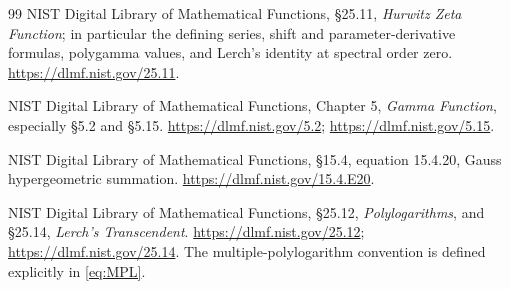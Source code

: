 \documentclass[11pt,letterpaper]{article}
\numberwithin{equation}{section}
\theoremstyle{definition}\newtheorem{definition}[theorem]{Definition}
\theoremstyle{remark}\newtheorem{remark}[theorem]{Remark}
\begin{document}
\begin{thebibliography}{99}
NIST Digital Library of Mathematical Functions,
\S25.11, \emph{Hurwitz Zeta Function}; in particular the defining series,
shift and parameter-derivative formulas, polygamma values, and Lerch's
identity at spectral order zero.
\url{https://dlmf.nist.gov/25.11}.

NIST Digital Library of Mathematical Functions,
Chapter 5, \emph{Gamma Function}, especially \S5.2 and \S5.15.
\url{https://dlmf.nist.gov/5.2}; \url{https://dlmf.nist.gov/5.15}.

NIST Digital Library of Mathematical Functions,
\S15.4, equation 15.4.20, Gauss hypergeometric summation.
\url{https://dlmf.nist.gov/15.4.E20}.

NIST Digital Library of Mathematical Functions,
\S25.12, \emph{Polylogarithms}, and \S25.14, \emph{Lerch's Transcendent}.
\url{https://dlmf.nist.gov/25.12}; \url{https://dlmf.nist.gov/25.14}.
The multiple-polylogarithm convention is defined explicitly in
\eqref{eq:MPL}.

\end{thebibliography}

\end{document}
